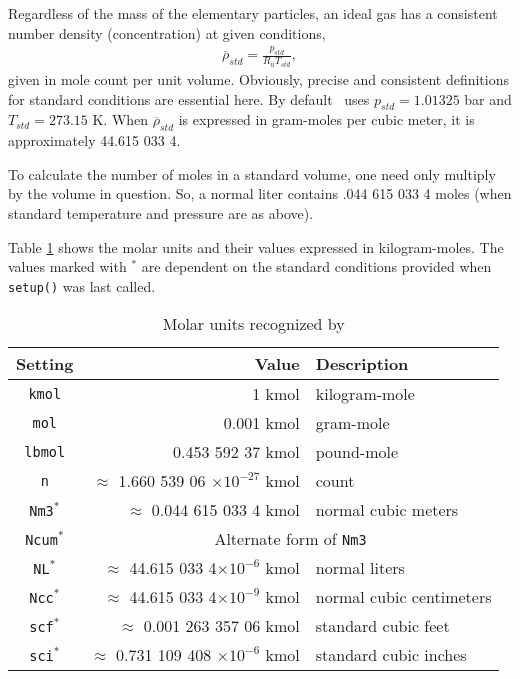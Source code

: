 Regardless of the mass of the elementary particles, an ideal gas has a consistent number density (concentration) at given conditions,
\begin{align}
\overline{\rho}_{std} = \frac{p_{std}}{R_u T_{std}},
\end{align}
given in mole count per unit volume.  Obviously, precise and consistent definitions for standard conditions are essential here.  By default \PM\ uses $p_{std} = 1.01325$ bar and $T_{std} = 273.15$ K.  When $\overline{\rho}_{std}$ is expressed in gram-moles per cubic meter, it is approximately 44.615 033 4.

To calculate the number of moles in a standard volume, one need only multiply by the volume in question.  So, a normal liter contains .044 615 033 4 moles (when standard temperature and pressure are as above).

Table \ref{tab:molar} shows the molar units and their values expressed in kilogram-moles.  The values marked with $^*$ are dependent on the standard conditions provided when \verb|setup()| was last called.

\begin{table}
\centering
\caption{Molar units recognized by \PM}\label{tab:molar}
\begin{tabular}{crl}
\hline
Setting & Value & Description\\
\hline
\verb|kmol| & 1 kmol & kilogram-mole\\
\verb|mol| & 0.001 kmol & gram-mole\\
\verb|lbmol| & 0.453 592 37 kmol & pound-mole\\
\verb|n| & $\approx$ 1.660 539 06 $\times 10^{-27}$ kmol & count \\
\verb|Nm3|$^*$ & $\approx$ 0.044 615 033 4 kmol & normal cubic meters\\
\verb|Ncum|$^*$ & \multicolumn{2}{c}{Alternate form of \texttt{Nm3}}\\
\verb|NL|$^*$ & $\approx$ 44.615 033 4$\times 10^{-6}$ kmol & normal liters\\
\verb|Ncc|$^*$ & $\approx$ 44.615 033 4$\times 10^{-9}$ kmol & normal cubic centimeters\\
\verb|scf|$^*$ & $\approx$ 0.001 263 357 06 kmol & standard cubic feet\\
\verb|sci|$^*$ & $\approx$ 0.731 109 408 $\times 10^{-6}$ kmol & standard cubic inches\\
\hline
\end{tabular}
\end{table}

